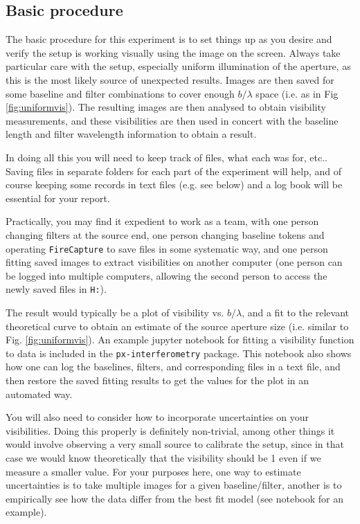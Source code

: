 \documentclass[11pt]{article}
\begin{document}
\subsection{Basic procedure}

The basic procedure for this experiment is to set things up as you desire and verify the setup is working visually using the image on the screen. Always take particular care with the setup, especially uniform illumination of the aperture, as this is the most likely source of unexpected results. Images are then saved for some baseline and filter combinations to cover enough $b/\lambda$ space (i.e. as in Fig \ref{fig:uniformvis}). The resulting images are then analysed to obtain visibility measurements, and these visibilities are then used in concert with the baseline length and filter wavelength information to obtain a result.

In doing all this you will need to keep track of files, what each was for, etc.. Saving files in separate folders for each part of the experiment will help, and of course keeping some records in text files (e.g. see below) and a log book will be essential for your report.

Practically, you may find it expedient to work as a team, with one person changing filters at the source end, one person changing baseline tokens and operating \texttt{FireCapture} to save files in some systematic way, and one person fitting saved images to extract visibilities on another computer (one person can be logged into multiple computers, allowing the second person to access the newly saved files in \texttt{H:}).

The result would typically be a plot of visibility vs. $b/\lambda$, and a fit to the relevant theoretical curve to obtain an estimate of the source aperture size (i.e. similar to Fig. \ref{fig:uniformvis}). An example jupyter notebook for fitting a visibility function to data is included in the \texttt{px-interferometry} package. This notebook also shows how one can log the baselines, filters, and corresponding files in a text file, and then restore the saved fitting results to get the values for the plot in an automated way.

You will also need to consider how to incorporate uncertainties on your visibilities. Doing this properly is definitely non-trivial, among other things it would involve observing a very small source to calibrate the setup, since in that case we would know theoretically that the visibility should be 1 even if we measure a smaller value. For your purposes here, one way to estimate uncertainties is to take multiple images for a given baseline/filter, another is to empirically see how the data differ from the best fit model (see notebook for an example).
\end{document}
